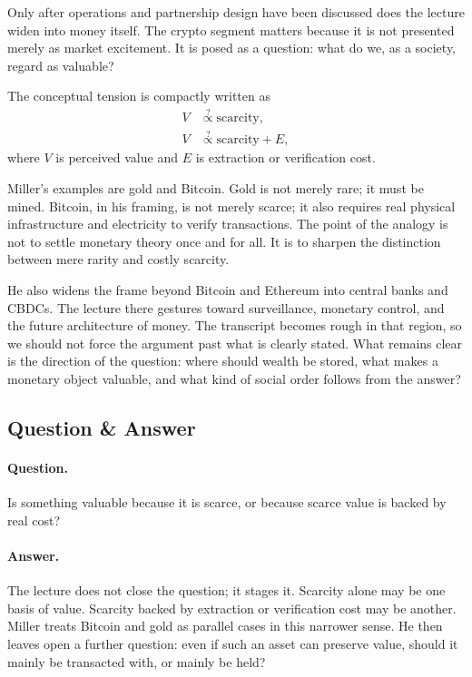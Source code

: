 Only after operations and partnership design have been discussed does the lecture widen into money itself. The crypto segment matters because it is not presented merely as market excitement. It is posed as a question: what do we, as a society, regard as valuable?

The conceptual tension is compactly written as
\begin{align}
V &\stackrel{?}{\propto} \text{scarcity},\\
V &\stackrel{?}{\propto} \text{scarcity}+E,
\end{align}
where \(V\) is perceived value and \(E\) is extraction or verification cost.

Miller's examples are gold and Bitcoin. Gold is not merely rare; it must be mined. Bitcoin, in his framing, is not merely scarce; it also requires real physical infrastructure and electricity to verify transactions. The point of the analogy is not to settle monetary theory once and for all. It is to sharpen the distinction between mere rarity and costly scarcity.

He also widens the frame beyond Bitcoin and Ethereum into central banks and CBDCs. The lecture there gestures toward surveillance, monetary control, and the future architecture of money. The transcript becomes rough in that region, so we should not force the argument past what is clearly stated. What remains clear is the direction of the question: where should wealth be stored, what makes a monetary object valuable, and what kind of social order follows from the answer?

\subsection{Question \& Answer}

\paragraph{Question.} Is something valuable because it is scarce, or because scarce value is backed by real cost?

\paragraph{Answer.} The lecture does not close the question; it stages it. Scarcity alone may be one basis of value. Scarcity backed by extraction or verification cost may be another. Miller treats Bitcoin and gold as parallel cases in this narrower sense. He then leaves open a further question: even if such an asset can preserve value, should it mainly be transacted with, or mainly be held?

